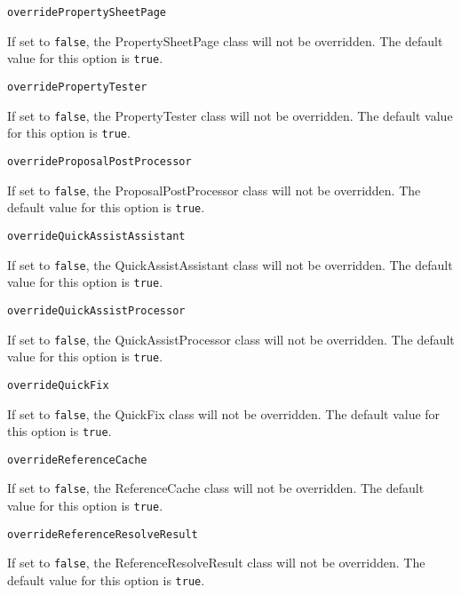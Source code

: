 \noindent\texttt{overridePropertySheetPage}
\begin{myindentpar}{1cm}
If set to \texttt{false}, the PropertySheetPage class will not be overridden. The default value for this option is \texttt{true}.
\end{myindentpar}

\noindent\texttt{overridePropertyTester}
\begin{myindentpar}{1cm}
If set to \texttt{false}, the PropertyTester class will not be overridden. The default value for this option is \texttt{true}.
\end{myindentpar}

\noindent\texttt{overrideProposalPostProcessor}
\begin{myindentpar}{1cm}
If set to \texttt{false}, the ProposalPostProcessor class will not be overridden. The default value for this option is \texttt{true}.
\end{myindentpar}

\noindent\texttt{overrideQuickAssistAssistant}
\begin{myindentpar}{1cm}
If set to \texttt{false}, the QuickAssistAssistant class will not be overridden. The default value for this option is \texttt{true}.
\end{myindentpar}

\noindent\texttt{overrideQuickAssistProcessor}
\begin{myindentpar}{1cm}
If set to \texttt{false}, the QuickAssistProcessor class will not be overridden. The default value for this option is \texttt{true}.
\end{myindentpar}

\noindent\texttt{overrideQuickFix}
\begin{myindentpar}{1cm}
If set to \texttt{false}, the QuickFix class will not be overridden. The default value for this option is \texttt{true}.
\end{myindentpar}

\noindent\texttt{overrideReferenceCache}
\begin{myindentpar}{1cm}
If set to \texttt{false}, the ReferenceCache class will not be overridden. The default value for this option is \texttt{true}.
\end{myindentpar}

\noindent\texttt{overrideReferenceResolveResult}
\begin{myindentpar}{1cm}
If set to \texttt{false}, the ReferenceResolveResult class will not be overridden. The default value for this option is \texttt{true}.
\end{myindentpar}

